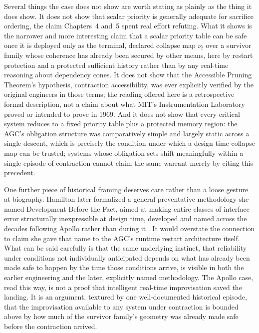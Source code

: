 \documentclass[11pt]{report}
\begin{document}
Several things the case does not show are worth stating as plainly as the thing it does show. It does not show that scalar priority is generally adequate for sacrifice ordering, the claim Chapters~4 and~5 spent real effort refuting. What it shows is the narrower and more interesting claim that a scalar priority table can be safe once it is deployed only as the terminal, declared collapse map $\nu_t$ over a survivor family whose coherence has already been secured by other means, here by restart protection and a protected sufficient history rather than by any real-time reasoning about dependency cones. It does not show that the Accessible Pruning Theorem's hypothesis, contraction accessibility, was ever explicitly verified by the original engineers in those terms; the reading offered here is a retrospective formal description, not a claim about what MIT's Instrumentation Laboratory proved or intended to prove in 1969. And it does not show that every critical system reduces to a fixed priority table plus a protected memory region: the AGC's obligation structure was comparatively simple and largely static across a single descent, which is precisely the condition under which a design-time collapse map can be trusted; systems whose obligation sets shift meaningfully within a single episode of contraction cannot claim the same warrant merely by citing this precedent.

One further piece of historical framing deserves care rather than a loose gesture at biography. Hamilton later formalized a general preventative methodology she named Development Before the Fact, aimed at making entire classes of interface error structurally inexpressible at design time, developed and named across the decades following Apollo rather than during it \cite{hamilton1976,hamiltonhackler2008}. It would overstate the connection to claim she gave that name to the AGC's runtime restart architecture itself. What can be said carefully is that the same underlying instinct, that reliability under conditions not individually anticipated depends on what has already been made safe to happen by the time those conditions arrive, is visible in both the earlier engineering and the later, explicitly named methodology. The Apollo case, read this way, is not a proof that intelligent real-time improvisation saved the landing. It is an argument, textured by one well-documented historical episode, that the improvisation available to any system under contraction is bounded above by how much of the survivor family's geometry was already made safe before the contraction arrived.
\end{document}
